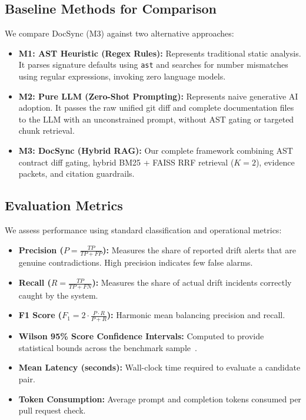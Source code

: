 \documentclass[12pt,onecolumn,draftclsnofoot]{IEEEtran}
\begin{document}
\subsection{Baseline Methods for Comparison}
We compare DocSync (M3) against two alternative approaches:
\begin{itemize}
    \item \textbf{M1: AST Heuristic (Regex Rules):} Represents traditional static analysis. It parses signature defaults using \texttt{ast} and searches for number mismatches using regular expressions, invoking zero language models.
    \item \textbf{M2: Pure LLM (Zero-Shot Prompting):} Represents naive generative AI adoption. It passes the raw unified git diff and complete documentation files to the LLM with an unconstrained prompt, without AST gating or targeted chunk retrieval.
    \item \textbf{M3: DocSync (Hybrid RAG):} Our complete framework combining AST contract diff gating, hybrid BM25 + FAISS RRF retrieval ($K=2$), evidence packets, and citation guardrails.
\end{itemize}

\subsection{Evaluation Metrics}
We assess performance using standard classification and operational metrics:
\begin{itemize}
    \item \textbf{Precision ($P = \frac{TP}{TP + FP}$):} Measures the share of reported drift alerts that are genuine contradictions. High precision indicates few false alarms.
    \item \textbf{Recall ($R = \frac{TP}{TP + FN}$):} Measures the share of actual drift incidents correctly caught by the system.
    \item \textbf{F1 Score ($F_1 = 2 \cdot \frac{P \cdot R}{P + R}$):} Harmonic mean balancing precision and recall.
    \item \textbf{Wilson 95\% Score Confidence Intervals:} Computed to provide statistical bounds across the benchmark sample~\cite{wilson1927ci}.
    \item \textbf{Mean Latency (seconds):} Wall-clock time required to evaluate a candidate pair.
    \item \textbf{Token Consumption:} Average prompt and completion tokens consumed per pull request check.
\end{itemize}
\end{document}
